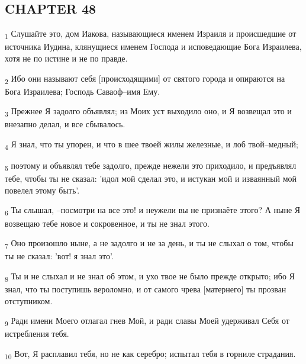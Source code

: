 \subsection{CHAPTER 48}
\begin{tcolorbox}
\textsubscript{1} Слушайте это, дом Иакова, называющиеся именем Израиля и происшедшие от источника Иудина, клянущиеся именем Господа и исповедающие Бога Израилева, хотя не по истине и не по правде.
\end{tcolorbox}
\begin{tcolorbox}
\textsubscript{2} Ибо они называют себя [происходящими] от святого города и опираются на Бога Израилева; Господь Саваоф--имя Ему.
\end{tcolorbox}
\begin{tcolorbox}
\textsubscript{3} Прежнее Я задолго объявлял; из Моих уст выходило оно, и Я возвещал это и внезапно делал, и все сбывалось.
\end{tcolorbox}
\begin{tcolorbox}
\textsubscript{4} Я знал, что ты упорен, и что в шее твоей жилы железные, и лоб твой--медный;
\end{tcolorbox}
\begin{tcolorbox}
\textsubscript{5} поэтому и объявлял тебе задолго, прежде нежели это приходило, и предъявлял тебе, чтобы ты не сказал: 'идол мой сделал это, и истукан мой и изваянный мой повелел этому быть'.
\end{tcolorbox}
\begin{tcolorbox}
\textsubscript{6} Ты слышал, --посмотри на все это! и неужели вы не признаёте этого? А ныне Я возвещаю тебе новое и сокровенное, и ты не знал этого.
\end{tcolorbox}
\begin{tcolorbox}
\textsubscript{7} Оно произошло ныне, а не задолго и не за день, и ты не слыхал о том, чтобы ты не сказал: 'вот! я знал это'.
\end{tcolorbox}
\begin{tcolorbox}
\textsubscript{8} Ты и не слыхал и не знал об этом, и ухо твое не было прежде открыто; ибо Я знал, что ты поступишь вероломно, и от самого чрева [матернего] ты прозван отступником.
\end{tcolorbox}
\begin{tcolorbox}
\textsubscript{9} Ради имени Моего отлагал гнев Мой, и ради славы Моей удерживал Себя от истребления тебя.
\end{tcolorbox}
\begin{tcolorbox}
\textsubscript{10} Вот, Я расплавил тебя, но не как серебро; испытал тебя в горниле страдания.
\end{tcolorbox}
